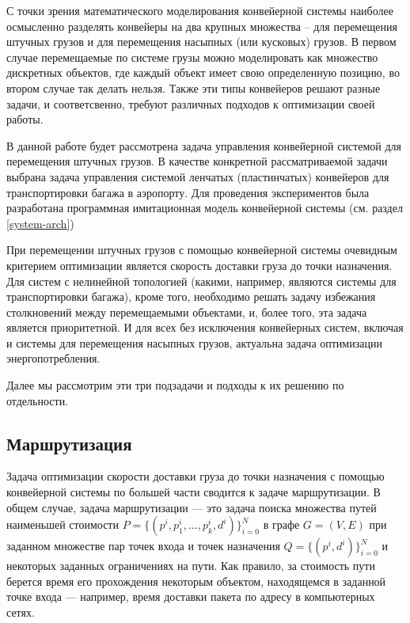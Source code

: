 \documentclass[specification,annotation,times]{itmo-student-thesis}
\theoremstyle{definition}
\begin{document}
С точки зрения математического моделирования конвейерной системы наиболее
осмысленно разделять конвейеры на два крупных множества -- для
перемещения штучных грузов и для перемещения насыпных (или кусковых) грузов.
В первом случае перемещаемые по системе грузы можно моделировать как множество
дискретных объектов, где каждый объект имеет свою определенную позицию, во
втором случае так делать нельзя. Также эти типы конвейеров решают разные задачи,
и соответсвенно, требуют различных подходов к оптимизации своей работы.

В данной работе будет рассмотрена задача управления конвейерной системой для
перемещения штучных грузов. В качестве конкретной рассматриваемой задачи выбрана
задача управления системой ленчатых (пластинчатых) конвейеров для
транспортировки багажа в аэропорту. Для проведения экспериментов 
была разработана программная имитационная модель конвейерной системы (см. раздел
\ref{system-arch})

При перемещении штучных грузов с помощью конвейерной системы очевидным критерием
оптимизации является скорость доставки груза до точки назначения. Для систем с
нелинейной топологией (какими, например, являются системы для транспортировки
багажа), кроме того, необходимо решать задачу избежания столкновений между
перемещаемыми объектами, и, более того, эта задача является приоритетной.
И для всех без исключения конвейерных систем, включая и системы для перемещения
насыпных грузов, актуальна задача оптимизации энергопотребления.

Далее мы рассмотрим эти три подзадачи и подходы к их решению по отдельности.

\subsection{Маршрутизация}\label{overview:routing}

Задача оптимизации скорости доставки груза до точки назначения с помощью
конвейерной системы по большей части сводится к задаче маршрутизации. В общем
случае, задача маршрутизации --- это задача поиска множества путей наименьшей
стоимости $P = \{(p^i, p_1^i, ... , p_k^i, d^i)\}_{i=0}^N$ в графе $G = (V, E)$ при
заданном множестве пар точек входа и точек назначения
$Q = \{(p^i, d^i)\}_{i=0}^N$ и некоторых заданных ограничениях на пути. Как
правило, за стоимость пути берется время его прохождения некоторым объектом,
находящемся в заданной точке входа --- например, время доставки пакета по адресу
в компьютерных сетях.
\end{document}
